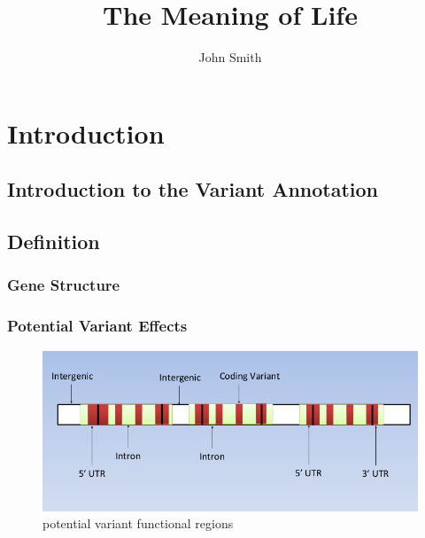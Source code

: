 \documentclass[onehalf,11pt]{beavtex}
\title{The Meaning of Life}
\author{John Smith}
\begin{document}
\maketitle

\mainmatter

\chapter{Introduction}
\section{Introduction to the Variant Annotation}

\section{Definition}
\subsection{Gene Structure}

\subsection{Potential Variant Effects}
\begin{figure}[!ht]
\centering
\includegraphics[scale=0.6]{./pic/type.png}
\caption{potential variant functional regions}
\label{fig:variant_effect} 
\end{figure}
\end{document}
